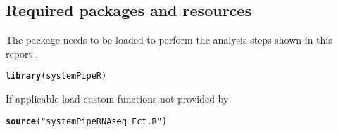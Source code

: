 \documentclass{article}\usepackage[]{graphicx}\usepackage[]{color}
\makeatletter
\newcommand{\hlstr}[1]{\textcolor[rgb]{0.192,0.494,0.8}{#1}}%
\newcommand{\hlstd}[1]{\textcolor[rgb]{0.345,0.345,0.345}{#1}}%
\newcommand{\hlkwd}[1]{\textcolor[rgb]{0.737,0.353,0.396}{\textbf{#1}}}%
\newenvironment{kframe}{%
 \def\at@end@of@kframe{}%
 \ifinner\ifhmode%
  \def\at@end@of@kframe{\end{minipage}}%
  \begin{minipage}{\columnwidth}%
 \fi\fi%
 \def\FrameCommand##1{\hskip\@totalleftmargin \hskip-\fboxsep
 \colorbox{shadecolor}{##1}\hskip-\fboxsep
     \hskip-\linewidth \hskip-\@totalleftmargin \hskip\columnwidth}%
 \MakeFramed {\advance\hsize-\width
   \@totalleftmargin\z@ \linewidth\hsize
   \@setminipage}}%
 {\par\unskip\endMakeFramed%
 \at@end@of@kframe}
\newenvironment{knitrout}{}{} %
\makeatother
\begin{document}
\subsection{Required packages and resources}
The  package needs to be loaded to perform the analysis steps shown in this report \citep{Girke2014-oy}. 
\begin{knitrout}
\color{fgcolor}\begin{kframe}
\begin{alltt}
\hlkwd{library}\hlstd{(systemPipeR)}
\end{alltt}
\end{kframe}
\end{knitrout}

If applicable load custom functions not provided by 
\begin{knitrout}
\color{fgcolor}\begin{kframe}
\begin{alltt}
\hlkwd{source}\hlstd{(}\hlstr{"systemPipeRNAseq_Fct.R"}\hlstd{)}
\end{alltt}
\end{kframe}
\end{knitrout}
\end{document}

